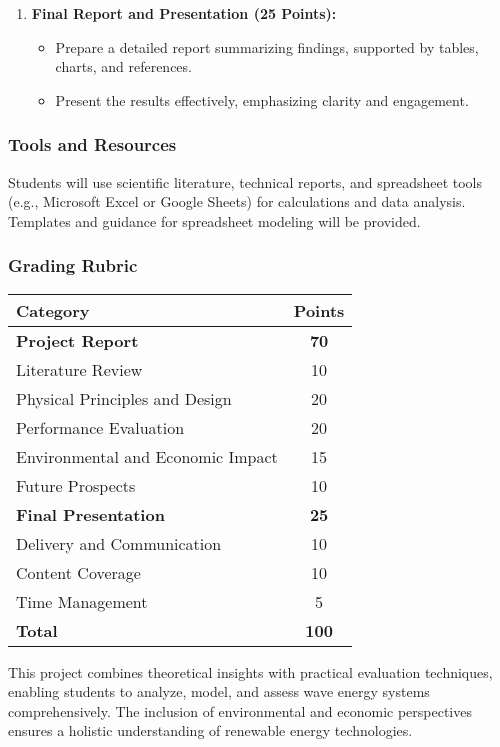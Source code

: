 \documentclass[11pt]{article}
\begin{document}
\begin{enumerate}
    \item \textbf{Final Report and Presentation (25 Points):}
    \begin{itemize}
        \item Prepare a detailed report summarizing findings, supported by tables, charts, and references.
        \item Present the results effectively, emphasizing clarity and engagement.
    \end{itemize}
\end{enumerate}

\subsubsection*{Tools and Resources}
Students will use scientific literature, technical reports, and spreadsheet tools (e.g., Microsoft Excel or Google Sheets) for calculations and data analysis. Templates and guidance for spreadsheet modeling will be provided.

\subsubsection*{Grading Rubric}
\begin{center}
\begin{tabular}{|l|c|}
\hline
\textbf{Category} & \textbf{Points} \\
\hline
\textbf{Project Report} & \textbf{70} \\
Literature Review & 10 \\
Physical Principles and Design & 20 \\
Performance Evaluation & 20 \\
Environmental and Economic Impact & 15 \\
Future Prospects & 10 \\
 \hline
        \textbf{Final Presentation} & \textbf{25} \\
        Delivery and Communication & 10 \\
        Content Coverage & 10 \\
        Time Management & 5 \\
        \hline
\hline
\textbf{Total} & \textbf{100} \\
\hline
\end{tabular}
\end{center}

This project combines theoretical insights with practical evaluation techniques, enabling students to analyze, model, and assess wave energy systems comprehensively. The inclusion of environmental and economic perspectives ensures a holistic understanding of renewable energy technologies.
\end{document}
